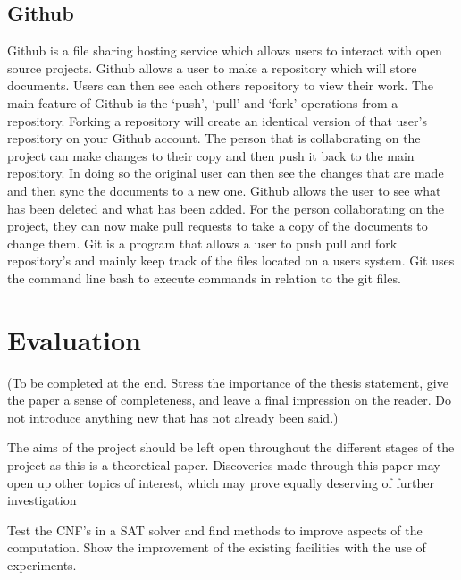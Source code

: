 \documentclass[11pt,a4paper, notitlepage]{report}
\begin{document}
\section{Github}
\label{sec:Git}

Github is a file sharing hosting service which allows users to interact with open source projects. Github allows a user to make a repository which will store documents. Users can then see each others repository to view their work. The main feature of Github is the `push', `pull' and `fork' operations from a repository. Forking a repository will create an identical version of that user's repository on your Github account. The person that is collaborating on the project can make changes to their copy and then push it back to the main repository. In doing so the original user can then see the changes that are made and then sync the documents to a new one. Github allows the user to see what has been deleted and what has been added. For the person collaborating on the project, they can now make pull requests to take a copy of the documents to change them.
Git is a program that allows a user to push pull and fork repository's and mainly keep track of the files located on a users system. Git uses the command line bash to execute commands in relation to the git files.















\chapter{Evaluation}
\label{cha:Eval}


(To be completed at the end. Stress the importance of the thesis statement, give the paper a sense of completeness, and
leave a final impression on the reader. Do not introduce anything new that has not already been said.)

The aims of the project should be left open throughout the different stages of the project as this is a theoretical paper. Discoveries made through this paper may open up other topics of interest, which may prove equally deserving of further investigation


Test the CNF's in a SAT solver and find methods to improve aspects of the computation.
Show the improvement of the existing facilities with the use of experiments.
\end{document}

